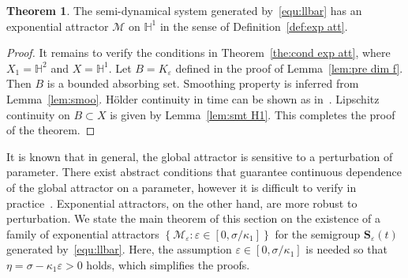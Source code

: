 \documentclass[11pt, reqno]{amsart}
\theoremstyle{definition}
\newtheorem{theorem}{Theorem}[section]
\numberwithin{equation}{section}
\newcommand{\bff}{\boldsymbol}
\newcommand{\bb}{\mathbb}
\newcommand{\norm}[2]{\left\|{#1}\right\|_{#2}}
\begin{document}
\begin{theorem}\label{the:exp attractor}
The semi-dynamical system generated by~\eqref{equ:llbar} has an exponential attractor $\mathcal{M}$ on $\bb{H}^1$ in the sense of Definition~\ref{def:exp att}.
\end{theorem}

\begin{proof}
It remains to verify the conditions in Theorem~\ref{the:cond exp att}, where $X_1=\bb{H}^2$ and $X=\bb{H}^1$. 
Let $B=K_\varepsilon$ defined in the proof of Lemma~\ref{lem:pre dim f}.
Then $B$ is a bounded absorbing set. Smoothing property is inferred from Lemma~\ref{lem:smoo}. H\"older continuity in time can be shown as in~\cite[Theorem 2.3]{SoeTra23}. Lipschitz continuity on $B\subset X$ is given by Lemma~\ref{lem:smt H1}. This completes the proof of the theorem.
\end{proof}


It is known that in general, the global attractor is sensitive to a perturbation of parameter. There exist abstract conditions that guarantee continuous dependence of the global attractor on a parameter, however it is difficult to verify in practice~\cite{Zel23}. Exponential attractors, on the other hand, are more robust to perturbation.
We state the main theorem of this section on the existence of a family of exponential attractors $\left\{\mathcal{M}_\varepsilon: \varepsilon\in [0, \sigma/\kappa_1]\right\}$ for the semigroup $\bff{S}_\varepsilon(t)$ generated by~\eqref{equ:llbar}. Here, the assumption $\varepsilon\in [0, \sigma/\kappa_1]$ is needed so that $\eta= \sigma-\kappa_1 \varepsilon>0$ holds, which simplifies the proofs.
\end{document}
